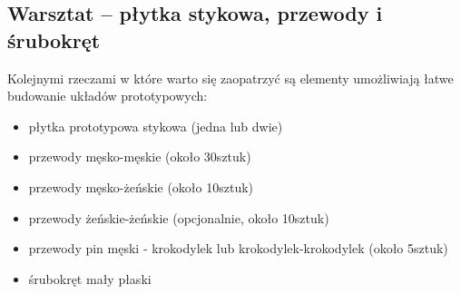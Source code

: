 % 
% 
% 
% 

\subsection{Warsztat – płytka stykowa, przewody i śrubokręt}

Kolejnymi rzeczami w które warto się zaopatrzyć są elementy umożliwiają łatwe budowanie układów prototypowych:
\begin{itemize}
	\item płytka prototypowa stykowa (jedna lub dwie)
	\item przewody męsko-męskie (około 30sztuk)
	\item przewody męsko-żeńskie (około 10sztuk)
	\item przewody żeńskie-żeńskie (opcjonalnie, około 10sztuk)
	\item przewody pin męski - krokodylek lub krokodylek-krokodylek (około 5sztuk)
	\item śrubokręt mały płaski
\end{itemize}


